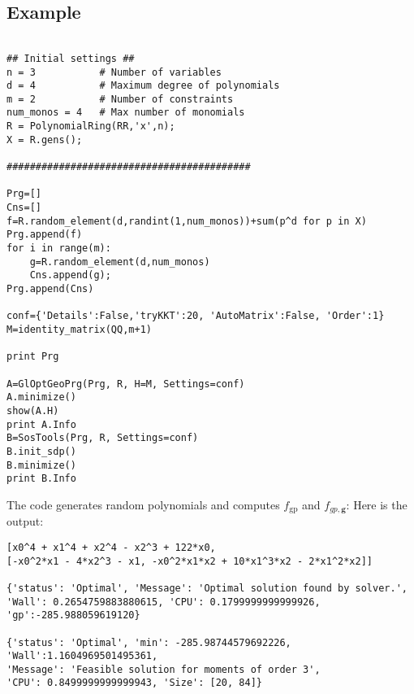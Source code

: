 \documentclass{amsart}
\theoremstyle{definition}
\newcommand{\rgp}[1]{#1_{\textrm{gp}}}
\begin{document}
\subsection{Example}
\begin{verbatim}

## Initial settings ##
n = 3			# Number of variables
d = 4			# Maximum degree of polynomials
m = 2			# Number of constraints
num_monos = 4	# Max number of monomials
R = PolynomialRing(RR,'x',n);
X = R.gens();

##########################################

Prg=[]
Cns=[]
f=R.random_element(d,randint(1,num_monos))+sum(p^d for p in X)
Prg.append(f)
for i in range(m):
    g=R.random_element(d,num_monos)
    Cns.append(g);
Prg.append(Cns)

conf={'Details':False,'tryKKT':20, 'AutoMatrix':False, 'Order':1}
M=identity_matrix(QQ,m+1)

print Prg

A=GlOptGeoPrg(Prg, R, H=M, Settings=conf)
A.minimize()
show(A.H)
print A.Info
B=SosTools(Prg, R, Settings=conf)
B.init_sdp()
B.minimize()
print B.Info
\end{verbatim}
The code generates random polynomials and computes $\rgp{f}$ and $f_{gp,\textbf{g}}$: Here is the output:
\begin{verbatim}
[x0^4 + x1^4 + x2^4 - x2^3 + 122*x0, 
[-x0^2*x1 - 4*x2^3 - x1, -x0^2*x1*x2 + 10*x1^3*x2 - 2*x1^2*x2]]

{'status': 'Optimal', 'Message': 'Optimal solution found by solver.', 
'Wall': 0.2654759883880615, 'CPU': 0.1799999999999926, 'gp':-285.988059619120}

{'status': 'Optimal', 'min': -285.98744579692226, 'Wall':1.1604969501495361, 
'Message': 'Feasible solution for moments of order 3', 
'CPU': 0.8499999999999943, 'Size': [20, 84]}
\end{verbatim}
\end{document}
